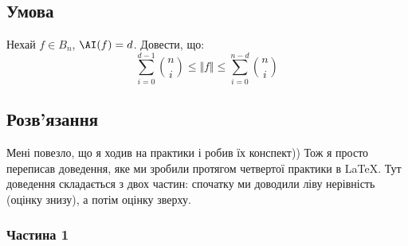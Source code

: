 \chapter{}
\label{chap:3}

\section{Умова}
Нехай $f \in B_{n}$, $\AI(f) = d$. Довести, що:
\begin{equation*}
    \sum\limits_{i=0}^{d-1} \binom{n}{i} \leq \Vert f \Vert \leq \sum\limits_{i=0}^{n-d} \binom{n}{i}
\end{equation*}

\section{Розв'язання}
Мені повезло, що я ходив на практики і робив їх конспект)) Тож я просто переписав доведення, яке ми зробили протягом 
четвертої практики в \LaTeX{}. Тут доведення складається з двох частин: спочатку ми доводили ліву нерівність (оцінку 
знизу), а потім оцінку зверху.

\subsection*{Частина 1}


